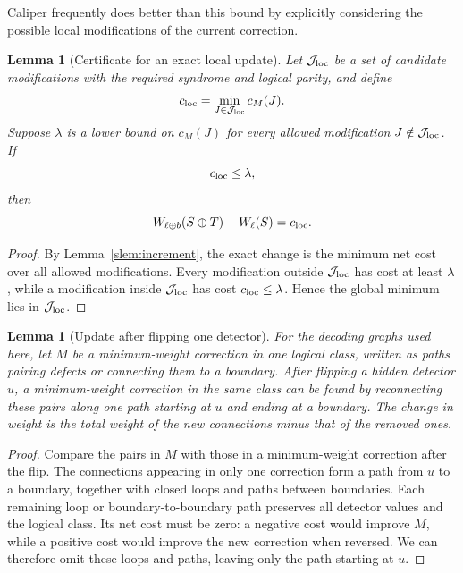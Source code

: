 \documentclass[
    reprint,
    amsmath,amssymb,
    nofootinbib,
    superscriptaddress,
    aps,
    noeprint,
    longbibliography,
    prl
]{revtex4-2}
\theoremstyle{plain}
\newtheorem{lemma}[theorem]{Lemma}
\begin{document}
Caliper frequently does better than this bound by explicitly considering the possible local
modifications of the current correction.

\begin{lemma}[Certificate for an exact local update]
    \label{slem:cert}
    Let $\mathcal J_{\rm loc}$ be a set of candidate modifications with the required syndrome and
    logical parity, and define
    \begin{equation}
        c_{\rm loc}
        =
        \min_{J\in\mathcal J_{\rm loc}} c_M(J).
    \end{equation}
    Suppose $\lambda$ is a lower bound on $c_M(J)$ for every allowed modification $J\notin\mathcal
    J_{\rm loc}$. If
    \begin{equation}
        c_{\rm loc}\leq\lambda,
    \end{equation}
    then
    \begin{equation}
        W_{\ell\oplus b}(S\oplus T)-W_\ell(S)
        =
        c_{\rm loc}.
    \end{equation}
\end{lemma}

\begin{proof}
    By Lemma~\ref{slem:increment}, the exact change is the minimum net cost over all allowed
    modifications. Every modification outside $\mathcal J_{\rm loc}$ has cost at least $\lambda$,
    while a modification inside $\mathcal J_{\rm loc}$ has cost $c_{\rm loc}\leq\lambda$. Hence the
    global minimum lies in $\mathcal J_{\rm loc}$.
\end{proof}

\begin{lemma}[Update after flipping one detector]
    \label{slem:chain}
    For the decoding graphs used here, let $M$ be a minimum-weight correction in one logical
    class, written as paths pairing defects or connecting them to a boundary. After flipping
    a hidden detector $u$, a minimum-weight
    correction in the same class can be found by reconnecting these pairs along one path
    starting at $u$ and ending at a boundary. The change in weight is the total weight of the
    new connections minus that of the removed ones.
\end{lemma}
\begin{proof}
    Compare the pairs in $M$ with those in a minimum-weight correction after the flip. The
    connections appearing in only one correction form a path from $u$ to a boundary, together
    with closed loops and paths between boundaries. Each remaining loop or boundary-to-boundary
    path preserves all detector values and the logical class. Its net cost must be zero: a negative
    cost would improve $M$, while a positive cost would improve the new correction when
    reversed. We can therefore omit these loops and paths, leaving only the path starting at $u$.
\end{proof}
\end{document}
